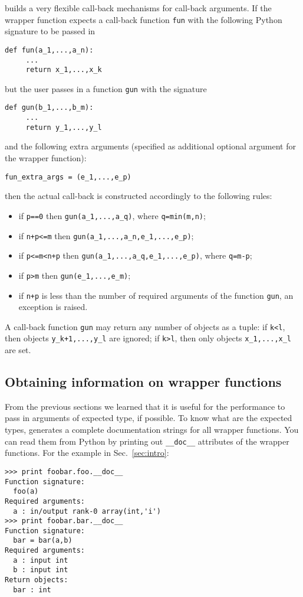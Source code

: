 \fpy builds a very flexible call-back mechanisms for call-back
arguments. If the wrapper function expects a call-back function \texttt{fun}
with the following Python signature to be passed in
\begin{verbatim}
def fun(a_1,...,a_n):
     ...
     return x_1,...,x_k
\end{verbatim}
but the user passes in a function \texttt{gun} with the signature
\begin{verbatim}
def gun(b_1,...,b_m):
     ...
     return y_1,...,y_l
\end{verbatim}
and the following extra arguments (specified as additional optional
argument for the wrapper function):
\begin{verbatim}
fun_extra_args = (e_1,...,e_p)
\end{verbatim}
then the actual call-back is constructed accordingly to the following rules:
\begin{itemize}
\item if \texttt{p==0} then \texttt{gun(a\_1,...,a\_q)}, where
  \texttt{q=min(m,n)};
\item if \texttt{n+p<=m}  then \texttt{gun(a\_1,...,a\_n,e\_1,...,e\_p)};
\item if \texttt{p<=m<n+p}  then \texttt{gun(a\_1,...,a\_q,e\_1,...,e\_p)},
  where \texttt{q=m-p};
\item if \texttt{p>m}  then \texttt{gun(e\_1,...,e\_m)};
\item if \texttt{n+p}  is less than the number of required arguments
  of the function \texttt{gun}, an exception is raised.
\end{itemize}

A call-back function \texttt{gun} may return any number of objects as a tuple:
if \texttt{k<l}, then objects \texttt{y\_k+1,...,y\_l} are ignored;
if \texttt{k>l}, then only objects \texttt{x\_1,...,x\_l} are set.


\subsection{Obtaining information on wrapper functions}
\label{sec:info}

From the previous sections we learned that it is useful for the
performance to pass in arguments of expected type, if possible. To
know what are the expected types, \fpy generates a complete
documentation strings for all wrapper functions. You can read them
from Python by printing out \texttt{\_\_doc\_\_} attributes of the
wrapper functions.  For the example in Sec.~\ref{sec:intro}:
\begin{verbatim}
>>> print foobar.foo.__doc__
Function signature:
  foo(a)
Required arguments:
  a : in/output rank-0 array(int,'i')
>>> print foobar.bar.__doc__
Function signature:
  bar = bar(a,b)
Required arguments:
  a : input int
  b : input int
Return objects:
  bar : int
\end{verbatim}


